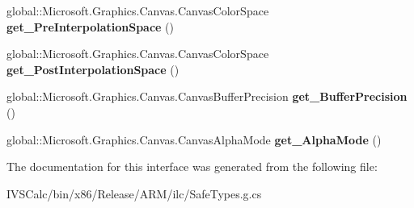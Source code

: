\begin{DoxyCompactItemize}
global\+::\+Microsoft.\+Graphics.\+Canvas.\+Canvas\+Color\+Space {\bfseries get\+\_\+\+Pre\+Interpolation\+Space} ()
\item 
\mbox{\label{interface_microsoft_1_1_graphics_1_1_canvas_1_1_brushes_1_1_i_canvas_radial_gradient_brush_a2c50ad2b61a126873338d5ea34c679a4}} 
global\+::\+Microsoft.\+Graphics.\+Canvas.\+Canvas\+Color\+Space {\bfseries get\+\_\+\+Post\+Interpolation\+Space} ()
\item 
\mbox{\label{interface_microsoft_1_1_graphics_1_1_canvas_1_1_brushes_1_1_i_canvas_radial_gradient_brush_ae9f40c9850f28dbdbdb35e2a96d02bd1}} 
global\+::\+Microsoft.\+Graphics.\+Canvas.\+Canvas\+Buffer\+Precision {\bfseries get\+\_\+\+Buffer\+Precision} ()
\item 
\mbox{\label{interface_microsoft_1_1_graphics_1_1_canvas_1_1_brushes_1_1_i_canvas_radial_gradient_brush_a602ce1fabe87e97329540cbb790009fa}} 
global\+::\+Microsoft.\+Graphics.\+Canvas.\+Canvas\+Alpha\+Mode {\bfseries get\+\_\+\+Alpha\+Mode} ()
\end{DoxyCompactItemize}


The documentation for this interface was generated from the following file\+:\begin{DoxyCompactItemize}
\item 
I\+V\+S\+Calc/bin/x86/\+Release/\+A\+R\+M/ilc/Safe\+Types.\+g.\+cs\end{DoxyCompactItemize}
